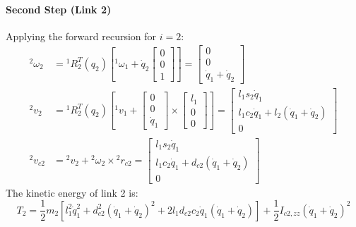 \documentclass[11pt,a4paper]{article}
\begin{document}
\paragraph{Second Step (Link 2)}
Applying the forward recursion for $i=2$:
\begin{align}
    {}^2\omega_2 &= {}^1R_2^T(q_2) \left[ {}^1\omega_1 + \dot{q}_2 \begin{bmatrix} 0 \\ 0 \\ 1 \end{bmatrix} \right] = \begin{bmatrix} 0 \\ 0 \\ \dot{q}_1 + \dot{q}_2 \end{bmatrix} \\
    {}^2v_2 &= {}^1R_2^T(q_2) \left[ {}^1v_1 + \begin{bmatrix} 0 \\ 0 \\ \dot{q}_1 \end{bmatrix} \times \begin{bmatrix} l_1 \\ 0 \\ 0 \end{bmatrix} \right] = \begin{bmatrix} l_1 s_2 \dot{q}_1 \\ l_1 c_2 \dot{q}_1 + l_2(\dot{q}_1 + \dot{q}_2) \\ 0 \end{bmatrix} \\
    {}^2v_{c2} &= {}^2v_2 + {}^2\omega_2 \times {}^2r_{c2} = \begin{bmatrix} l_1 s_2 \dot{q}_1 \\ l_1 c_2 \dot{q}_1 + d_{c2}(\dot{q}_1 + \dot{q}_2) \\ 0 \end{bmatrix}
\end{align}
The kinetic energy of link 2 is:
\begin{equation}
    T_2 = \frac{1}{2}m_2 \left[ l_1^2 \dot{q}_1^2 + d_{c2}^2(\dot{q}_1 + \dot{q}_2)^2 + 2l_1 d_{c2} c_2 \dot{q}_1(\dot{q}_1 + \dot{q}_2) \right] + \frac{1}{2}I_{c2,zz}(\dot{q}_1 + \dot{q}_2)^2
\end{equation}
\end{document}
